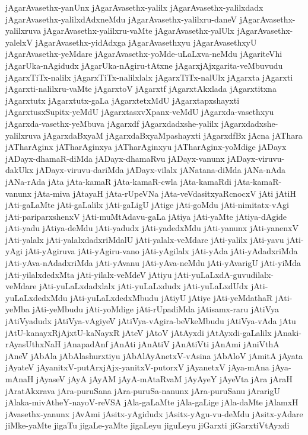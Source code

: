 {jAgarAvasethx-yanUnx
jAgarAvasethx-yalilx
jAgarAvasethx-yalilxdadx
jAgarAvasethx-yalilxdAdxneMdu
jAgarAvasethx-yalilxru-daneV
jAgarAvasethx-yalilxruva
jAgarAvasethx-yalilxru-vaMte
jAgarAvasethx-yalUlx
jAgarAvasethx-yalelxV
jAgarAvasethx-yidAdxga
jAgarAvasethxyu
jAgarAvasethxyU
jAgarAvasethx-yeMdare
jAgarAvasethx-yoMde-uLaLxva-neMdu
jAgariteVhi
jAgarUka-nAgidudx
jAgarUka-nAgiru-tAtxne
jAgarxjAjxgarita-veMbuvudu
jAgarxTiTx-nalilx
jAgarxTiTx-nalilxlalx
jAgarxTiTx-nalUlx
jAgarxta
jAgarxti
jAgarxti-nalilxru-vaMte
jAgarxtoV
jAgarxtf
jAgarxtAkxlada
jAgarxtitxna
jAgarxtutx
jAgarxtutx-gaLa
jAgarxtetxMdU
jAgarxtapxshayxti
jAgarxtusxSupitx-yeMdU
jAgarxtasxvXpanx-veMdU
jAgarxda-vasethxyu
jAgarxda-vasethx-yeMbuva
jAgarxdf
jAgarxdadxshe-yalilx
jAgarxdadxshe-yalilxruva
jAgarxdaBxyaM
jAgarxdaBxyaMpashayxti
jAgarxdfBx
jAcna
jAThara
jATharAginx
jATharAginxya
jATharAginxyu
jATharAginx-yoMdige
jADayx
jADayx-dhamaR-diMda
jADayx-dhamaRvu
jADayx-vanunx
jADayx-viruvu-dakUkx
jADayx-viruvu-dariMda
jADayx-vilalx
jANatana-diMda
jANa-nAda
jANa-rAda
jAta
jAta-kamaR
jAta-kamaR-cwla
jAta-kamaRdi
jAta-kamaR-vanunx
jAta-miva
jAtayaH
jAta-rUpeVNa
jAta-veVdasitxyaRcnocxV
jAti
jAtiH
jAti-gaLaMte
jAti-gaLalilx
jAti-gaLigU
jAtige
jAti-goMdu
jAti-nimitatx-vAgi
jAti-pariparxshenxV
jAti-muMtAdavu-gaLa
jAtiya
jAti-yaMte
jAtiya-dAgide
jAti-yadu
jAtiya-deMdu
jAti-yadudx
jAti-yadedxMdu
jAti-yanunx
jAti-yanenxV
jAti-yalalx
jAti-yalalxdadxriMdalU
jAti-yalalx-veMdare
jAti-yalilx
jAti-yavu
jAti-yAgi
jAti-yAgiruva
jAti-yAgiru-vano
jAti-yAgilalx
jAti-yAda
jAti-yAdadxriMda
jAti-yAva-nAdadxriMda
jAti-yAvanu
jAti-yAva-neMdu
jAti-yAvarigU
jAti-yiMda
jAti-yilalxdedxMta
jAti-yilalx-veMdeV
jAtiyu
jAti-yuLaLxdA-guvudilalx-veMdare
jAti-yuLaLxdadxlalx
jAti-yuLaLxdudx
jAti-yuLaLxdUdx
jAti-yuLaLxdedxMdu
jAti-yuLaLxdedxMbudu
jAtiyU
jAtiye
jAti-yeMdathaR
jAti-yeMba
jAti-yeMbudu
jAti-yoMdige
jAti-rUpadiMda
jAtisamx-raru
jAtiVya
jAtiVyadudx
jAtiVya-vAgiyeV
jAtiVya-vAgira-beVkeMbudu
jAtiVya-vAda
jAtu
jAtU-kanayxRjAjxtU-kaNayxR
jAteV
jAtoV
jAtAyxdi
jAtAyxdi-gaLalilx
jAnaki-rAyasUthxNaH
jAnapadAnf
jAnAti
jAnAtiV
jAnAtiVti
jAnAmi
jAniVthA
jAneV
jAbAla
jAbAlashurxtiyu
jAbAlAyAnetxV-vAsina
jAbAloV
jAmitA
jAyata
jAyateV
jAyanitxV-putArxjAjx-yanitxV-putorxV
jAyanetxV
jAya-mAna
jAya-mAnaH
jAyaseV
jAyA
jAyAM
jAyA-mAtaRvaM
jAyAyeY
jAyeVta
jAra
jAraH
jAratAkxrava
jAra-puruSana
jAra-puruSa-nanunx
jAra-puruSanu
jArarigU
jAlaka-mivAtheY-nayoV-reVSA
jAla-gaLaMte
jAla-gaLige
jAla-daMte
jAlamxH
jAvasethx-yanunx
jAvAmi
jAsitx-yAgidudx
jAsitx-yAgu-vu-deMdu
jAsitx-yAdare
jiMke-yaMte
jigaTu
jigaLe-yaMte
jigaLeyu
jiguLeyu
jiGarxti
jiGarxtiVtAyxdi
}
